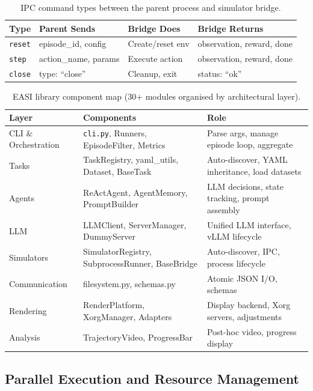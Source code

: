 \documentclass[
hf,
]{confart}
\begin{document}
\begin{table}[htbp]
\centering
\caption{IPC command types between the parent process and simulator bridge.}
\label{tab:ipc_commands}
\small
\renewcommand{\arraystretch}{1.1}
\begin{tabular}{llll}
\toprule
\textbf{Type} & \textbf{Parent Sends} & \textbf{Bridge Does} & \textbf{Bridge Returns} \\
\midrule
\texttt{reset} & episode\_id, config & Create/reset env & observation, reward, done \\
\texttt{step} & action\_name, params & Execute action & observation, reward, done \\
\texttt{close} & type: ``close'' & Cleanup, exit & status: ``ok'' \\
\bottomrule
\end{tabular}
\end{table}

\begin{table}[htbp]
\centering
\caption{EASI library component map (30+ modules organised by architectural layer).}
\label{tab:component_map}
\small
\renewcommand{\arraystretch}{1.1}
\begin{tabular}{lp{3.5cm}p{4cm}}
\toprule
\textbf{Layer} & \textbf{Components} & \textbf{Role} \\
\midrule
CLI \& Orchestration & \texttt{cli.py}, Runners, EpisodeFilter, Metrics & Parse args, manage episode loop, aggregate \\
Tasks & TaskRegistry, yaml\_utils, Dataset, BaseTask & Auto-discover, YAML inheritance, load datasets \\
Agents & ReActAgent, AgentMemory, PromptBuilder & LLM decisions, state tracking, prompt assembly \\
LLM & LLMClient, ServerManager, DummyServer & Unified LLM interface, vLLM lifecycle \\
Simulators & SimulatorRegistry, SubprocessRunner, BaseBridge & Auto-discover, IPC, process lifecycle \\
Communication & filesystem.py, schemas.py & Atomic JSON I/O, schemas \\
Rendering & RenderPlatform, XorgManager, Adapters & Display backend, Xorg servers, adjustments \\
Analysis & TrajectoryVideo, ProgressBar & Post-hoc video, progress display \\
\bottomrule
\end{tabular}
\end{table}

\subsection{Parallel Execution and Resource Management}
\label{sec:appendix_parallel}
\end{document}
